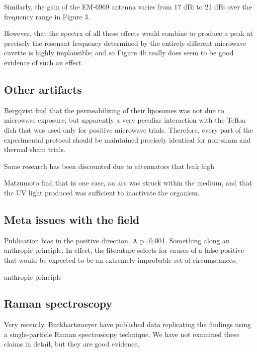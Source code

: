 \documentclass[paper.tex]{subfiles}
\begin{document}
\begin{multicols}{1}
Similarly, the gain of the EM-6969 antenna\cite{EM6969} varies from 17 dBi to 21 dBi over the frequency range in Figure 3.

However, that the spectra of all these effects would combine to produce a peak at precisely the resonant frequency determined by the entirely different microwave cuvette is highly implausible; and so Figure 4b really does seem to be good evidence of such an effect.


\subsection{Other artifacts}

Bergqvist \cite{Effect1994a} find that the permeabilizing of their liposomes was not due to microwave exposure, but apparently a very peculiar interaction with the Teflon dish that was used only for positive microwave trials. Therefore, every part of the experimental protocol should be maintained precisely identical for non-sham and thermal sham trials.

Some research has been discounted due to attenuators that leak high 

Matzumoto \cite{Inactivation1991} find that in one case, an arc was struck within the medium, and that the UV light produced was sufficient to inactivate the organism.


\subsection{Meta issues with the field}


Publication bias in the positive direction. A p=0.001. Something along an anthropic principle. In effect, the literature selects for causes of a false positive that would be expected to be an extremely improbable set of circumstances; 

anthropic principle


\subsection{Raman spectroscopy}

Very recently, Burkhartsmeyer \cite{Optical2020} have published data replicating the findings using a single-particle Raman spectroscopy technique. We have not examined these claims in detail, but they are good evidence.


\end{multicols}
\end{document}
